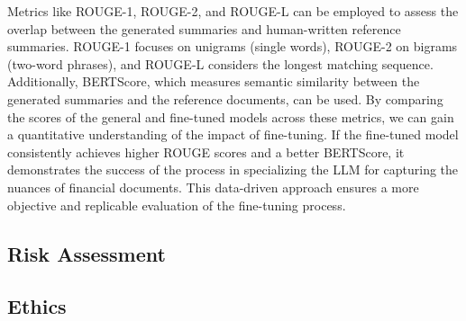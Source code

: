 Metrics like ROUGE-1, ROUGE-2, and ROUGE-L can be employed to assess the overlap between the generated summaries and
human-written reference summaries.
ROUGE-1 focuses on unigrams (single words), ROUGE-2 on bigrams (two-word phrases), and ROUGE-L considers the longest
matching sequence.
Additionally, BERTScore, which measures semantic similarity between the generated summaries and the reference documents,
can be used.
By comparing the scores of the general and fine-tuned models across these metrics, we can gain a quantitative
understanding of the impact of fine-tuning.
If the fine-tuned model consistently achieves higher ROUGE scores and a better BERTScore, it demonstrates the success of
the process in specializing the LLM for capturing the nuances of financial documents.
This data-driven approach ensures a more objective and replicable evaluation of the fine-tuning process.


\subsection{Risk Assessment}\label{subsec:risk-assessment}


\subsection{Ethics}\label{subsec:ethics}
